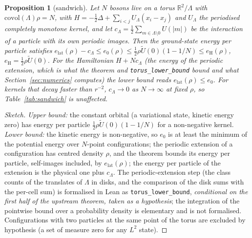 \documentclass[11pt,a4paper]{article}
\newtheorem{proposition}{Proposition}
\newcommand{\elat}{e_{\mathrm{lat}}}
\newcommand{\eH}{e_{\mathrm{H}}}
\begin{document}
\begin{proposition}[sandwich]\label{prop:sandwich}
Let $N$ bosons live on a torus $\mathbb R^2/\Lambda$ with $\mathrm{covol}(\Lambda)\rho=N$, with $H=-\tfrac12\Delta+\sum_{i<j}U_\Lambda(x_i-x_j)$
and $U_\Lambda$ the periodised completely monotone kernel, and let $c_\Lambda=\tfrac12\sum_{m\in\Lambda\setminus0}U(|m|)$ be the interaction of
a particle with its own periodic images. Then the ground-state energy per particle satisfies
$\elat(\rho)-c_\Lambda\le e_0(\rho)\le\tfrac12\rho\tilde U(0)(1-1/N)\le\eH(\rho)$, $\eH=\tfrac12\rho\tilde U(0)$. For the
Hamiltonian $H+Nc_\Lambda$ (the energy of the periodic extension, which is what the theorem and \texttt{torus\_lower\_bound} bound and what
Section~\ref{sec:numerics} computes) the lower bound reads $\elat(\rho)\le e_0$. For kernels that decay faster than $r^{-2}$, $c_\Lambda\to0$ as
$N\to\infty$ at fixed $\rho$, so Table~\ref{tab:sandwich} is unaffected.
\end{proposition}
\begin{proof}[Sketch]
\emph{Upper bound:} the constant orbital (a variational state, kinetic energy zero) has energy per particle
$\tfrac12\rho\tilde U(0)(1-1/N)$ for a non-negative kernel.
\emph{Lower bound:} the kinetic energy is non-negative, so $e_0$ is at least the minimum of the potential energy over $N$-point
configurations; the periodic extension of a configuration has centred density $\rho$, and the theorem bounds its energy per particle,
self-images included, by $\elat(\rho)$; the energy per particle of the extension is the physical one plus $c_\Lambda$. The
periodic-extension step (the class counts of the translates of $\Lambda$ in disks, and the comparison of the disk sums with the
per-cell sum) is formalised in Lean as \texttt{torus\_lower\_bound}, \emph{conditional on the first half of the upstream
theorem, taken as a hypothesis}; the integration of the pointwise bound over a probability density is elementary and is not
formalised. Configurations with two particles at the same point of the torus are excluded by hypothesis (a set of measure zero for
any $L^2$ state).
\end{proof}
\end{document}
